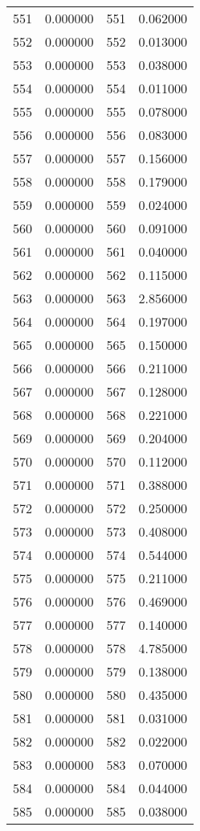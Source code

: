 \documentclass[12pt]{article}
\begin{document}
\begin{longtable}{@{}cccc@{}}
551 & 0.000000 & 551 & 0.062000 \\
552 & 0.000000 & 552 & 0.013000 \\
553 & 0.000000 & 553 & 0.038000 \\
554 & 0.000000 & 554 & 0.011000 \\
555 & 0.000000 & 555 & 0.078000 \\
556 & 0.000000 & 556 & 0.083000 \\
557 & 0.000000 & 557 & 0.156000 \\
558 & 0.000000 & 558 & 0.179000 \\
559 & 0.000000 & 559 & 0.024000 \\
560 & 0.000000 & 560 & 0.091000 \\
561 & 0.000000 & 561 & 0.040000 \\
562 & 0.000000 & 562 & 0.115000 \\
563 & 0.000000 & 563 & 2.856000 \\
564 & 0.000000 & 564 & 0.197000 \\
565 & 0.000000 & 565 & 0.150000 \\
566 & 0.000000 & 566 & 0.211000 \\
567 & 0.000000 & 567 & 0.128000 \\
568 & 0.000000 & 568 & 0.221000 \\
569 & 0.000000 & 569 & 0.204000 \\
570 & 0.000000 & 570 & 0.112000 \\
571 & 0.000000 & 571 & 0.388000 \\
572 & 0.000000 & 572 & 0.250000 \\
573 & 0.000000 & 573 & 0.408000 \\
574 & 0.000000 & 574 & 0.544000 \\
575 & 0.000000 & 575 & 0.211000 \\
576 & 0.000000 & 576 & 0.469000 \\
577 & 0.000000 & 577 & 0.140000 \\
578 & 0.000000 & 578 & 4.785000 \\
579 & 0.000000 & 579 & 0.138000 \\
580 & 0.000000 & 580 & 0.435000 \\
581 & 0.000000 & 581 & 0.031000 \\
582 & 0.000000 & 582 & 0.022000 \\
583 & 0.000000 & 583 & 0.070000 \\
584 & 0.000000 & 584 & 0.044000 \\
585 & 0.000000 & 585 & 0.038000 \\

\end{longtable}
\end{document}
